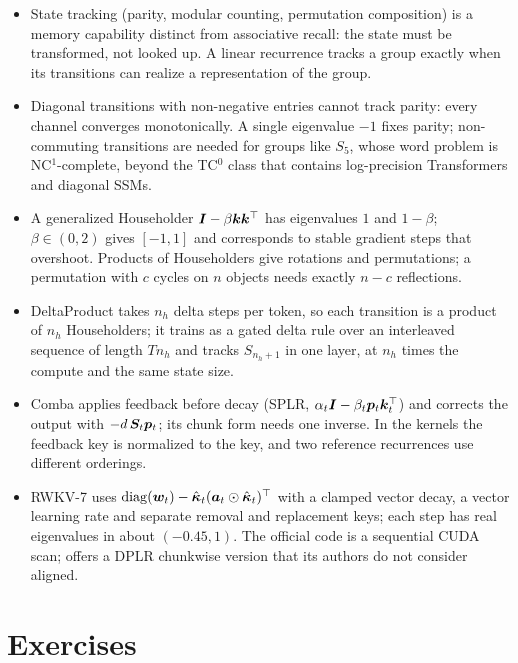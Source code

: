 \begin{summarybox}
\begin{itemize}
\item State tracking (parity, modular counting, permutation composition) is a memory
capability distinct from associative recall: the state must be transformed, not looked up.
A linear recurrence tracks a group exactly when its transitions can realize a representation
of the group.
\item Diagonal transitions with non-negative entries cannot track parity: every channel
converges monotonically. A single eigenvalue $-1$ fixes parity; non-commuting transitions are
needed for groups like $S_5$, whose word problem is NC$^1$-complete, beyond the TC$^0$ class
that contains log-precision Transformers and diagonal SSMs.
\item A generalized Householder $\bm{I}-\beta\bm{k}\bm{k}^{\top}$ has eigenvalues $1$ and $1-\beta$;
$\beta\in(0,2)$ gives $[-1,1]$ and corresponds to stable gradient steps that overshoot.
Products of Householders give rotations and permutations; a permutation with $c$ cycles on
$n$ objects needs exactly $n-c$ reflections.
\item DeltaProduct takes $n_h$ delta steps per token, so each transition is a product of
$n_h$ Householders; it trains as a gated delta rule over an interleaved sequence of length
$Tn_h$ and tracks $S_{n_h+1}$ in one layer, at $n_h$ times the compute and the same state size.
\item Comba applies feedback before decay (SPLR, $\alpha_t\bm{I}-\beta_t\bm{p}_t\bm{k}_t^{\top}$) and corrects
the output with $-d\,\bm{S}_t\bm{p}_t$; its chunk form needs one inverse. In the \fla{} kernels the
feedback key is normalized to the key, and two reference recurrences use different orderings.
\item RWKV-7 uses $\operatorname{diag}(\bm{w}_t)-\hat{\bm\kappa}_t(\bm{a}_t\odot\hat{\bm\kappa}_t)^{\top}$ with a clamped
vector decay, a vector learning rate and separate removal and replacement keys; each step has
real eigenvalues in about $(-0.45,1)$. The official code is a sequential CUDA scan; \fla{}
offers a DPLR chunkwise version that its authors do not consider aligned.
\end{itemize}
\end{summarybox}

\section*{Exercises}

